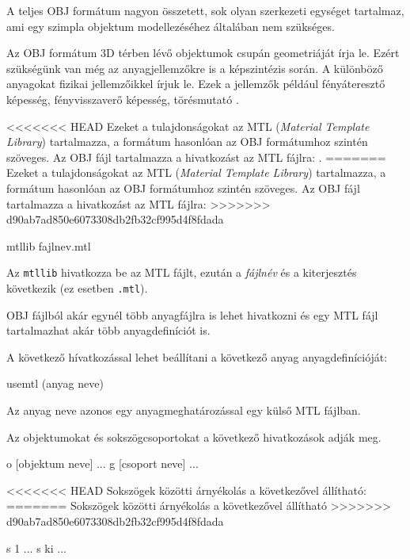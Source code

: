 A teljes OBJ formátum nagyon összetett, sok olyan szerkezeti egységet tartalmaz, ami egy szimpla objektum modellezéséhez általában nem szükséges.


Az OBJ formátum 3D térben lévő objektumok csupán geometriáját írja le. Ezért szükségünk van még az anyagjellemzőkre is a képszintézis során. A különböző anyagokat fizikai jellemzőikkel írjuk le. Ezek a jellemzők például fényáteresztő képesség, fényvisszaverő képesség, törésmutató \cite{diane1995mtl}.


<<<<<<< HEAD
Ezeket a tulajdonságokat az MTL (\textit{Material Template Library}) tartalmazza, a formátum hasonlóan az OBJ formátumhoz szintén szöveges. Az OBJ fájl tartalmazza a hivatkozást az {MTL} fájlra: \cite{diane1995mtl}.
=======
Ezeket a tulajdonságokat az MTL (\textit{Material Template Library}) tartalmazza, a formátum hasonlóan az OBJ formátumhoz szintén szöveges. Az OBJ fájl tartalmazza a hivatkozást az {MTL} fájlra:
>>>>>>> d90ab7ad850e6073308db2fb32cf995d4f8fdada
\begin{python}
mtllib fajlnev.mtl
\end{python}
Az \texttt{mtllib} hivatkozza be az MTL fájlt, ezután a \textsl{fájlnév} és a kiterjesztés következik (ez esetben \texttt{.mtl}).

OBJ fájlból akár egynél több anyagfájlra is lehet hivatkozni és egy MTL fájl tartalmazhat akár több anyagdefiníciót is.

A következő hívatkozással lehet beállítani a következő anyag anyagdefinícióját:
\begin{python}
usemtl (anyag neve)
\end{python}
Az anyag neve azonos egy anyagmeghatározással egy külső MTL fájlban.

Az objektumokat és sokszögcsoportokat a következő hivatkozások adják meg.
\begin{python}
o [objektum neve]
  ...
  g [csoport neve]
  ...
\end{python}

<<<<<<< HEAD
Sokszögek közötti árnyékolás a következővel állítható:
=======
Sokszögek közötti árnyékolás a következővel állítható
>>>>>>> d90ab7ad850e6073308db2fb32cf995d4f8fdada
\begin{python}
s 1
  ...
  s ki
  ...
\end{python}



